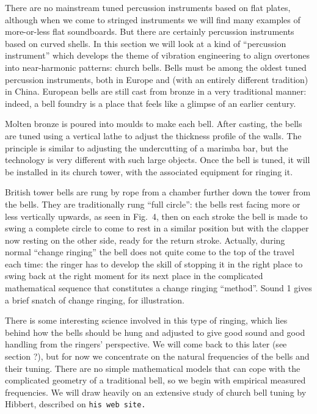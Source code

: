 

  There are no mainstream tuned percussion instruments based on flat plates, 
  although when we come to stringed instruments we will find many examples of 
  more-or-less flat soundboards. But there are certainly percussion instruments 
  based on curved shells. In this section we will look at a kind of 
  ``percussion instrument'' which develops the theme of vibration engineering 
  to align overtones into near-harmonic patterns: church bells. Bells must be 
  among the oldest tuned percussion instruments, both in Europe and (with an 
  entirely different tradition) in China. European bells are still cast from 
  bronze in a very traditional manner: indeed, a bell foundry is a place that 
  feels like a glimpse of an earlier century. 

  Molten bronze is poured into moulds to make each bell. After casting, the 
  bells are tuned using a vertical lathe to adjust the thickness profile of the 
  walls. The principle is similar to adjusting the undercutting of a marimba 
  bar, but the technology is very different with such large objects. Once the 
  bell is tuned, it will be installed in its church tower, with the associated 
  equipment for ringing it. 

  British tower bells are rung by rope from a chamber further down the tower 
  from the bells. They are traditionally rung ``full circle'': the bells rest 
  facing more or less vertically upwards, as seen in Fig.\ 4, then on each 
  stroke the bell is made to swing a complete circle to come to rest in a 
  similar position but with the clapper now resting on the other side, ready 
  for the return stroke. Actually, during normal ``change ringing'' the bell 
  does not quite come to the top of the travel each time: the ringer has to 
  develop the skill of stopping it in the right place to swing back at the 
  right moment for its next place in the complicated mathematical sequence that 
  constitutes a change ringing ``method''. Sound 1 gives a brief snatch of 
  change ringing, for illustration. 

  There is some interesting science involved in this type of ringing, which 
  lies behind how the bells should be hung and adjusted to give good sound and 
  good handling from the ringers' perspective. We will come back to this later 
  (see section ?), but for now we concentrate on the natural frequencies of the 
  bells and their tuning. There are no simple mathematical models that can cope 
  with the complicated geometry of a traditional bell, so we begin with 
  empirical measured frequencies. We will draw heavily on an extensive study of 
  church bell tuning by Hibbert, described on \tt{}his web site\rm{}. 

